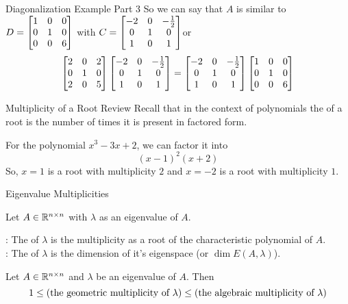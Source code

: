 \documentclass[xcoler=dvipsnames, aspectratio=169]{beamer}
\begin{document}
    \begin{frame}{Diagonalization Example Part 3}
        So we can say that $A$ is similar to $D=\begin{bmatrix}1 & 0 & 0\\0 & 1 & 0 \\ 0 & 0 & 6\end{bmatrix}$ with 
        $C=\begin{bmatrix}
            -2 & 0 & -\frac{1}{2}\\
            0 & 1 & 0\\
            1 & 0 & 1
        \end{bmatrix}$\pause or
        \[
            \begin{bmatrix}
                2 & 0 & 2\\
                0 & 1 & 0\\
                2 & 0 & 5
            \end{bmatrix}\begin{bmatrix}
                -2 & 0 & -\frac{1}{2}\\
                0 & 1 & 0\\
                1 & 0 & 1
            \end{bmatrix} = \begin{bmatrix}
                -2 & 0 & -\frac{1}{2}\\
                0 & 1 & 0\\
                1 & 0 & 1
            \end{bmatrix}\begin{bmatrix}
                1 & 0 & 0\\
                0 & 1 & 0\\
                0 & 0 & 6
            \end{bmatrix}
        \]
    \end{frame}
    \begin{frame}{Multiplicity of a Root Review}
        Recall that in the context of polynomials the  of a root is the number
        of times it is present in factored form.\pause
        \begin{example}
            For the polynomial $x^3 - 3x + 2$, we can factor it into
            \[
                (x-1)^2(x+2)
            \]
            So, $x=1$ is a root with multiplicity $2$ and $x=-2$ is a root with multiplicity $1$.
        \end{example}
    \end{frame}
    \begin{frame}{Eigenvalue Multiplicities}
        \begin{defn}
            Let $A\in\mathbb{R}^{n\times n}$ with $\lambda$ as an eigenvalue of $A$.

            : The  of $\lambda$ is the
            multiplicity as a root of the characteristic polynomial of $A$.\pause\\
            : The  of $\lambda$ is
            the dimension of it's eigenspace (or $\dim{E(A,\lambda)}$).
        \end{defn}
        \pause
        \begin{tcolorbox}
            Let $A\in\mathbb{R}^{n\times n}$ and $\lambda$ be an eigenvalue of $A$. Then
            \[
                1\leq(\textnormal{the geometric multiplicity of }\lambda)\leq(\textnormal{the algebraic multiplicity of }\lambda)
            \]
        \end{tcolorbox}
    \end{frame}
\end{document}
